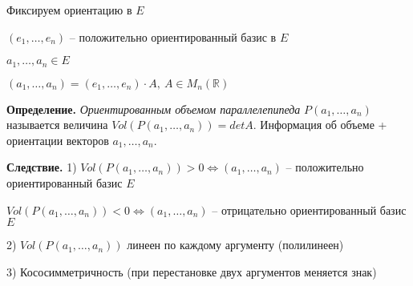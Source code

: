 \vspace{\baselineskip}
Фиксируем ориентацию в $E$

$(e_1, \dots, e_n)$ -- положительно ориентированный базис в $E$

\vspace{\baselineskip}
$a_1, \dots, a_n \in E$

$(a_1, \dots, a_n) = (e_1, \dots, e_n) \cdot A, \ A \in M_n(\mathbb{R})$

\vspace{\baselineskip}
\textbf{Определение.} \textit{Ориентированным объемом параллелепипеда} $P(a_1, \dots, a_n)$ называется величина $Vol(P(a_1, \dots, a_n)) = det A$. Информация об объеме + ориентации векторов $a_1, \dots, a_n$.

\vspace{\baselineskip}
\textbf{Следствие.} 1) $Vol(P(a_1, \dots, a_n)) > 0 \Leftrightarrow (a_1, \dots, a_n)$ -- положительно ориентированный базис $E$

$Vol(P(a_1, \dots, a_n)) < 0 \Leftrightarrow (a_1, \dots, a_n)$ -- отрицательно ориентированный базис $E$

2) $Vol(P(a_1, \dots, a_n))$ линеен по каждому аргументу (полилинеен)

3) Кососимметричность (при перестановке двух аргументов меняется знак)

